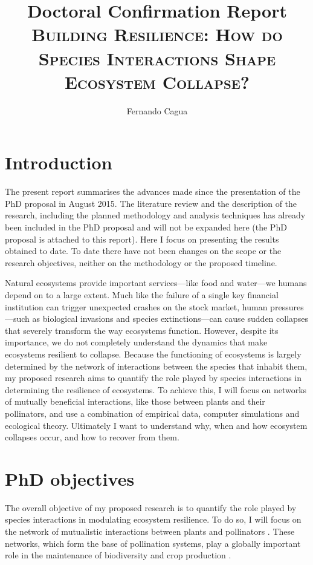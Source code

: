 \documentclass[a4paper]{article}
\title{
	{\normalsize Doctoral Confirmation Report} \\
	{\LARGE \textsc{Building Resilience: How do Species Interactions Shape Ecosystem Collapse?}}
}
\author{
  {\large Fernando Cagua}
}
\date{}
\begin{document}
\maketitle







\section*{Introduction}

The present report summarises the advances made since the presentation of the PhD proposal in August 2015. The literature review and the description of the research, including the planned methodology and analysis techniques has already been included in the PhD proposal and will not be expanded here (the PhD proposal is attached to this report). Here I focus on presenting the results obtained to date. To date there have not been changes on the scope or the research objectives, neither on the methodology or the proposed timeline.

Natural ecosystems provide important services---like food and water---we humans depend on to a large extent.
  Much like the failure of a single key financial institution can trigger unexpected crashes on the stock market, human pressures---such as biological invasions and species extinctions---can cause sudden collapses that severely transform the way ecosystems function.
  However, despite its importance, we do not completely understand the dynamics that make ecosystems resilient to collapse.
  Because the functioning of ecosystems is largely determined by the network of interactions between the species that inhabit them, my proposed research aims to quantify the role played by species interactions in determining the resilience of ecosystems.
  To achieve this, I will focus on networks of mutually beneficial interactions, like those between plants and their pollinators, and use a combination of empirical data, computer simulations and ecological theory.
  Ultimately I want to understand why, when and how ecosystem collapses occur, and how to recover from them.

\section*{PhD objectives}

The overall objective of my proposed research is to quantify the role played by species interactions in modulating ecosystem resilience. 
To do so, I will focus on the network of mutualistic interactions between plants and pollinators \autocite{Bascompte2006, Bascompte2007, Klein2007}.
These networks, which form the base of pollination systems, play a globally important role in the maintenance of biodiversity and crop production \autocite{Bascompte2007, Klein2007}.
\end{document}
